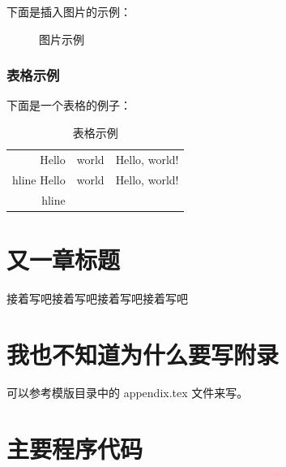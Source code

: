\documentclass{swfcthesis}
\begin{document}
下面是插入图片的示例：

\begin{figure}[!ht]
  \centering
  \caption{图片示例}
  \label{fig:hello}
\end{figure}

\subsection{表格示例}

下面是一个表格的例子：

\begin{table}[!ht]
  \centering
  \begin{tabular}{|r|c|l|}    \hline
    Hello&world&Hello, world!\\hline
    Hello&world&Hello, world!\\hline
  \end{tabular}
  \caption{表格示例}
\end{table}

\chapter{又一章标题}

接着写吧接着写吧接着写吧接着写吧


\Appendix{}
\printbibliography[heading={bibintoc},title={参考文献}] %
\advisorinfopage{}                 %
\acknowledgmentspage{}             %


\chapter{我也不知道为什么要写附录} %

可以参考模版目录中的 appendix.tex 文件来写。

\chapter{主要程序代码} %
\end{document}
